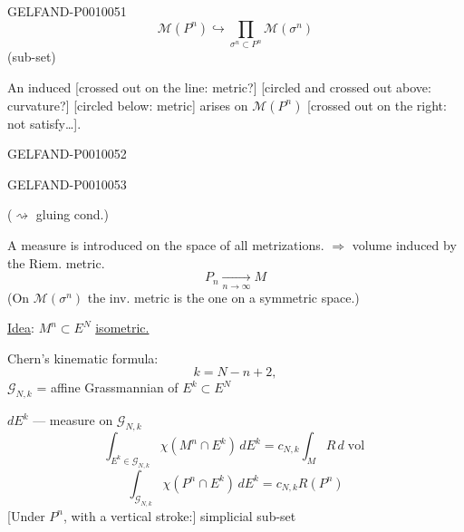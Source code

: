 \begin{GelfandAdjacentEvidence}{GELFAND-P001005}{1}
\begin{equation*}
\mathcal M(P^n)\hookrightarrow\prod_{\sigma^n\subset P^n}\mathcal M(\sigma^n) \tag{25}
\end{equation*}
(sub-set)

An induced [crossed out on the line: metric?] [circled and crossed out above: curvature?] [circled below: metric] arises on $\mathcal M(P^n)$ [crossed out on the right: not satisfy…].
\end{GelfandAdjacentEvidence}
\begin{GelfandAdjacentEvidence}{GELFAND-P001005}{2}

\end{GelfandAdjacentEvidence}
\begin{GelfandAdjacentEvidence}{GELFAND-P001005}{3}

\end{GelfandAdjacentEvidence}


($\rightsquigarrow$ gluing cond.)

A measure is introduced on the space of all metrizations. $\Rightarrow$ volume induced by the Riem. metric.
\[
P_n\underset{n\to\infty}{\longrightarrow}M
\]
(On $\mathcal M(\sigma^n)$ the inv. metric is the one on a symmetric space.)

\underline{Idea}: $M^n\subset E^N$ \underline{isometric.}

Chern’s kinematic formula:
\[
k=N-n+2,
\]
$\mathcal G_{N,k}$ = affine Grassmannian of $E^k\subset E^N$

$dE^k$ --- measure on $\mathcal G_{N,k}$
\begin{equation*}
\int_{E^k\in\mathcal G_{N,k}}\chi(M^n\cap E^k)\,dE^k
=c_{N,k}\int_M R\,d\operatorname{vol} \tag{26}
\end{equation*}
\begin{equation*}
\int_{\mathcal G_{N,k}}\chi(P^n\cap E^k)\,dE^k
=c_{N,k}R(P^n) \tag{27}
\end{equation*}
[Under $P^n$, with a vertical stroke:] simplicial sub-set


